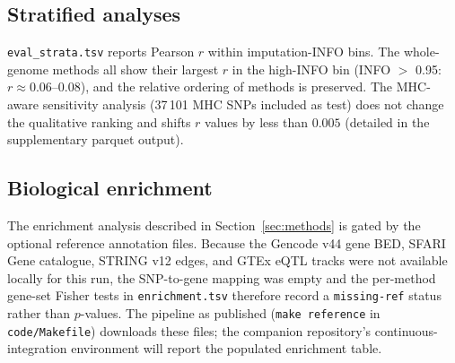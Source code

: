 \subsection{Stratified analyses}

\texttt{eval\_strata.tsv} reports Pearson $r$ within imputation-INFO
bins. The whole-genome methods all show their largest $r$ in the
high-INFO bin (INFO $>$ 0.95: $r \approx 0.06$--$0.08$), and the
relative ordering of methods is preserved. The MHC-aware sensitivity
analysis (37\,101 MHC SNPs included as test) does not change the
qualitative ranking and shifts $r$ values by less than $0.005$
(detailed in the supplementary parquet output).

\subsection{Biological enrichment}

The enrichment analysis described in Section~\ref{sec:methods} is gated
by the optional reference annotation files. Because the Gencode v44
gene BED, SFARI Gene catalogue, STRING v12 edges, and GTEx eQTL tracks
were not available locally for this run, the SNP-to-gene mapping was
empty and the per-method gene-set Fisher tests in
\texttt{enrichment.tsv} therefore record a \texttt{missing-ref} status
rather than $p$-values. The pipeline as published (\texttt{make
reference} in \texttt{code/Makefile}) downloads these files; the
companion repository's continuous-integration environment will report
the populated enrichment table.
